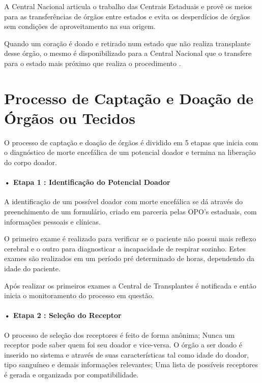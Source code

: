 \documentclass[portuguese,oneside]{tcc}
\begin{document}
A Central Nacional articula o trabalho das Centrais Estaduais e provê os meios para as transferências de órgãos entre estados e evita os desperdícios de órgãos sem condições de aproveitamento na sua origem. 

Quando um coração é doado e retirado num estado que não realiza transplante desse órgão, o mesmo é disponibilizado para a Central Nacional que o transfere para o estado mais próximo que realiza o procedimento \cite{SCSCT}.

\section{Processo de Captação e Doação de Órgãos ou Tecidos} \label{tab:processo-captacao-doacao}
O processo de captação e doação de órgãos é dividido em 5 etapas \cite{EPRECISOEDUCAR} que inicia com o diagnóstico de morte encefálica de um potencial doador e termina na liberação do corpo doador.

\paragraph*{• Etapa 1 : Identificação do Potencial Doador}

A identificação de um possível doador com morte encefálica se dá através do preenchimento de um formulário, criado em parceria pelas OPO’s estaduais, com informações pessoais e clínicas.

O primeiro exame é realizado para verificar se o paciente não possui mais reflexo cerebral e o outro para diagnosticar a incapacidade de respirar sozinho. Estes exames são realizados em um período pré determinado de horas, dependendo da idade do paciente. 

Após realizar os primeiros exames a Central de Transplantes é notificada e então inicia o monitoramento do processo em questão.

\paragraph*{• Etapa 2 : Seleção do Receptor}
O processo de seleção dos receptores é feito de forma anônima; Nunca um receptor pode saber quem foi seu doador e vice-versa. O órgão a ser doado é inserido no sistema e através de suas características tal como idade do doador, tipo sanguíneo e demais informações relevantes; Uma lista de possíveis receptores é gerada e organizada por compatibilidade.
\end{document}
